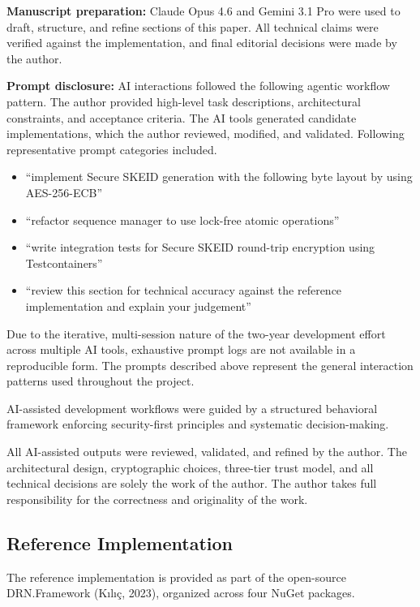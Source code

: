 \documentclass[fleqn,10pt,lineno]{wlpeerj}
\providecommand{\tightlist}{%
  \setlength{\itemsep}{0pt}\setlength{\parskip}{0pt}}
\begin{document}
\textbf{Manuscript preparation:} Claude Opus 4.6 and Gemini 3.1 Pro were
used to draft, structure, and refine sections of this paper. All
technical claims were verified against the implementation, and final
editorial decisions were made by the author.

\textbf{Prompt disclosure:} AI interactions followed the following
agentic workflow pattern. The author provided high-level task
descriptions, architectural constraints, and acceptance criteria. The AI
tools generated candidate implementations, which the author reviewed,
modified, and validated. Following representative prompt categories
included.

\begin{itemize}
\tightlist
\item
  ``implement Secure SKEID generation with the following byte layout by
  using AES-256-ECB''
\item
  ``refactor sequence manager to use lock-free atomic operations''
\item
  ``write integration tests for Secure SKEID round-trip encryption using
  Testcontainers''
\item
  ``review this section for technical accuracy against the reference
  implementation and explain your judgement''
\end{itemize}

Due to the iterative, multi-session nature of the two-year development
effort across multiple AI tools, exhaustive prompt logs are not
available in a reproducible form. The prompts described above represent
the general interaction patterns used throughout the project.

AI-assisted development workflows were guided by a structured behavioral
framework enforcing security-first principles and systematic
decision-making.

All AI-assisted outputs were reviewed, validated, and refined by the
author. The architectural design, cryptographic choices, three-tier
trust model, and all technical decisions are solely the work of the
author. The author takes full responsibility for the correctness and
originality of the work.

\newpage

\subsection{Reference Implementation}\label{reference-implementation}

The reference implementation is provided as part of the open-source
DRN.Framework (Kılıç, 2023), organized across four NuGet packages.
\end{document}
